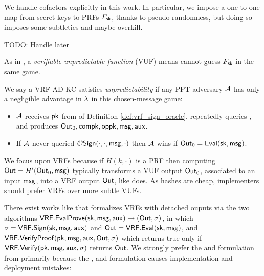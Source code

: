 We handle cofactors explicitly in this work.  In particular, we impose
a one-to-one map from secret keys \sk to PRFs $F_\mathsf{sk}$, thanks to
 pseudo-randomness, but doing so imposes some subtleties and maybe overkill.

TODO: Handle later


As in \cite{agg_dkg}, a {\em verifiable unpredictable function} (VUF)
means \adv cannot guess $F_\mathsf{sk}$ in the same game.

\begin{definition}
We say a VRF-AD-KC satisfies {\em unpredictability} if 
any PPT adversary $\mathcal{A}$ has only a negligible advantage in $\lambda$
in this chosen-message game:
\begin{itemize}
 \item $\mathcal{A}$ receives $\mathsf{pk}$ from  of Definition \ref{def:vrf_sign_oracle},
  repeatedly queries , and produces ${\mathsf{Out}}_0,\mathsf{compk},\mathsf{oppk},\mathsf{msg},\mathsf{aux}$.
 \item If $\mathcal{A}$ never queried $\mathcal{O}\mathsf{Sign}(\cdot,\cdot,\mathsf{msg},\cdot)$ then
  $\mathcal{A}$ wins if ${\mathsf{Out}}_0 = {\mathsf{Eval}}(\mathsf{sk},\mathsf{msg})$.
\end{itemize}
\end{definition}

We focus upon VRFs because
if $H(k,\cdot)$ is a PRF then computing ${\mathsf{Out}} = H'({\mathsf{Out}}_0, \mathsf{msg})$
typically transforms a VUF output ${\mathsf{Out}}_0$, associated to an input $\mathsf{msg}$,
into a VRF output ${\mathsf{Out}}$, like \cite[Proposition 1]{vrf_micali} does.
As hashes are cheap, implementers should prefer VRFs over more subtle VUFs.



There exist works like \cite[\S3.2 $\fvrf$]{praos} that formalizes VRFs with detached ouputs via the two algorithms
${\mathsf{VRF}}.{\mathsf{EvalProve}}(\mathsf{sk},\mathsf{msg},\mathsf{aux}) \mapsto ({\mathsf{Out}},\sigma)$, in which $\sigma = {\mathsf{VRF}}.{\mathsf{Sign}}(\mathsf{sk},\mathsf{msg},\mathsf{aux})$ and ${\mathsf{Out}} = {\mathsf{VRF}}.{\mathsf{Eval}}(\mathsf{sk},\mathsf{msg})$, and
${\mathsf{VRF}}.{\mathsf{VerifyProof}}(\mathsf{pk},\mathsf{msg},\mathsf{aux},{\mathsf{Out}},\sigma)$ which returns true only if ${\mathsf{VRF}}.{\mathsf{Verify}}(\mathsf{pk},\mathsf{msg},\mathsf{aux},\sigma)$ returns ${\mathsf{Out}}$.
We strongly prefer the \Sign and \Verify formulation from \cite{agg_dkg}
primarily because the , and 
formulation causes implementation and deployment mistakes:


